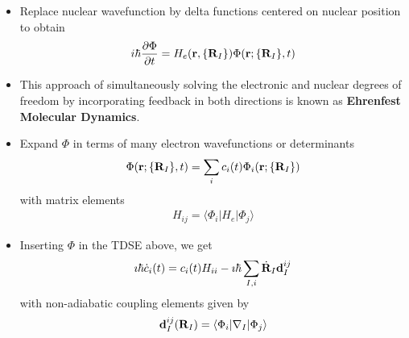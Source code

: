 \documentclass[slidestop,mathserif,compress,xcolor=svgnames]{beamer}
\begin{document}
\begin{frame}
\begin{itemize}
\item Replace nuclear wavefunction by delta functions centered on nuclear position to obtain
\begin{align*}
i\hbar\dfrac{\partial\Phi}{\partial t} = H_e({\bf r},\{{\bf R}_I\})\Phi({\bf r};\{{\bf R}_I\},t)
\end{align*}
\item This approach of simultaneously solving the electronic and nuclear degrees of freedom by incorporating feedback in both directions is known as \textbf{Ehrenfest Molecular Dynamics}.
\item Expand $\Phi$ in terms of many electron wavefunctions or  determinants
\begin{align*}
\Phi({\bf r};\{{\bf R}_I\},t) = \sum_i c_i(t)\Phi_i({\bf r};\{{\bf R}_I\})
\end{align*}
with matrix elements
\begin{align*}
H_{ij} = \langle\Phi_i|H_e|\Phi_j\rangle
\end{align*} 
\item Inserting $\Phi$ in the TDSE above, we get
\begin{align*}
\imath\hbar\dot{c}_i(t) = c_i(t)H_{ii} -\imath\hbar\sum_{I,i}\dot{\bf R}_I{\bf d}^{ij}_I
\end{align*}
with non-adiabatic coupling elements given by
\begin{align*}
{\bf d}^{ij}_I({\bf R}_I) = \langle\Phi_i|\nabla_I|\Phi_j\rangle
\end{align*}
\end{itemize}
\end{frame}
\end{document}
